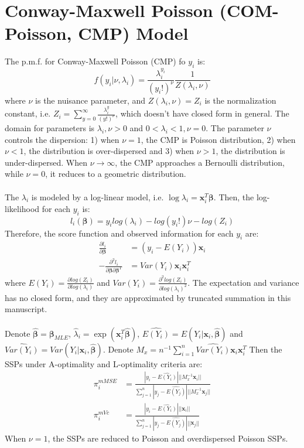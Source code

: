 \documentclass[]{article}
\begin{document}
\section{Conway-Maxwell Poisson (COM-Poisson, CMP) Model}
The p.m.f. for Conway-Maxwell Poisson (CMP) fo $y_i$ is:
$$
f(y_i|\nu, \lambda_i) = \frac{\lambda_i^{y_i}}{(y_i!)^{\nu}}\frac{1}{Z(\lambda_i, \nu)}
$$
where $\nu$ is the nuisance parameter, and $Z(\lambda_i, \nu) = Z_i$ is the normalization constant, i.e. $Z_i = \sum_{y=0}^{\infty}\frac{\lambda_i^{y}}{(y!)^{\nu}}$, which doesn't have closed form in general. The domain for parameters is $\lambda_i, \nu > 0$ and $0 < \lambda_i < 1, \nu = 0$. The parameter $\nu$ controls the dispersion: 1) when $\nu = 1$, the CMP is Poisson distribution, 2) when $\nu < 1$, the distribution is over-dispersed and 3) when $\nu > 1$, the distribution is under-dispersed. When $\nu\to\infty$, the CMP approaches a Bernoulli distribution, while $\nu=0$, it reduces to a geometric distribution.\\
\\
The $\lambda_i$ is modeled by a log-linear model, i.e. $\log{\lambda_i} = \boldsymbol{x}_i^{T}\boldsymbol{\beta}$. Then, the log-likelihood for each $y_i$ is:
$$
l_i(\boldsymbol{\beta}) =  y_i log(\lambda_i) - log(y_i!)\nu - log(Z_i)
$$
Therefore, the score function and observed information for each $y_i$ are:
\begin{align*}
	\frac{\partial l_i}{\partial \boldsymbol{\beta}} &= (y_i - E(Y_i))\boldsymbol{x}_i \\
	-\frac{\partial^2 l_i}{\partial \boldsymbol{\beta}\partial \boldsymbol{\beta}^{T}} &= Var(Y_i)\boldsymbol{x}_i\boldsymbol{x}_i^{T}
\end{align*}
where $E(Y_i) = \frac{\partial log(Z_i)}{\partial log(\lambda_i)}$ and $Var(Y_i) = \frac{\partial^2 log(Z_i)}{\partial log(\lambda_i)^2}$. The expectation and variance has no closed form, and they are approximated by truncated summation in this manuscript.\\
\\
Denote $\hat{\boldsymbol{\beta}} = \boldsymbol{\beta}_{MLE}$, $\hat{\lambda}_i = \exp(\boldsymbol{x}_i^{T}\hat{\boldsymbol{\beta}})$,
$\widehat{E(Y_i)} = E(Y_i|\boldsymbol{x}_i, \hat{\boldsymbol{\beta}})$ and $\widehat{Var(Y_i)} = Var(Y_i|\boldsymbol{x}_i, \hat{\boldsymbol{\beta}})$. Denote $M_x = n^{-1}\sum_{i=1}^{n}\widehat{Var(Y_i)}\boldsymbol{x}_i\boldsymbol{x}_i^{T}$ Then the SSPs under A-optimality and L-optimality criteria are:
\begin{align*}
	\pi_i^{mMSE} &= \frac{|y_i - \widehat{E(Y_i)}|||M_x^{-1}\boldsymbol{x}_i||}{\sum_{j=1}^{n}|y_j - \widehat{E(Y_j)}|||M_x^{-1}\boldsymbol{x}_j||}\\
	\pi_i^{mVc} &=\frac{|y_i - \widehat{E(Y_i)}|||\boldsymbol{x}_i||}{\sum_{j=1}^{n}|y_j - \widehat{E(Y_j)}|||\boldsymbol{x}_j||}
\end{align*}
When $\nu=1$, the SSPs are reduced to Poisson and overdispersed Poisson SSPs.
\end{document}
